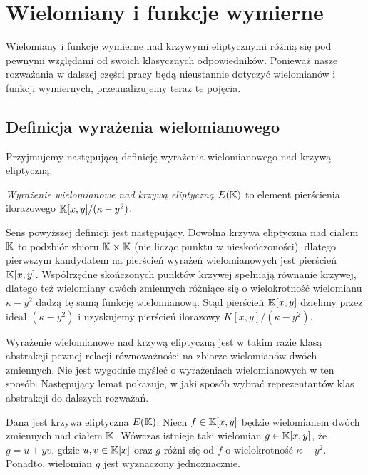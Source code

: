 \section{Wielomiany i funkcje wymierne}

Wielomiany i funkcje wymierne nad krzywymi eliptycznymi
różnią się pod pewnymi względami od swoich klasycznych odpowiedników.
Ponieważ nasze rozważania w dalszej części pracy
będą nieustannie dotyczyć wielomianów i funkcji wymiernych,
przeanalizujemy teraz te pojęcia.

\subsection*{Definicja wyrażenia wielomianowego}

Przyjmujemy następującą definicję
wyrażenia wielomianowego nad krzywą eliptyczną.

\begin{definition}
\emph{Wyrażenie wielomianowe nad krzywą eliptyczną $E(\mathbb{K})$}
to element pierścienia ilorazowego
$\mathbb{K}[x,y]/(\kappa - y^2)$.
\end{definition}

Sens powyższej definicji jest następujący.
Dowolna krzywa eliptyczna nad ciałem $\mathbb{K}$ to podzbiór zbioru $\mathbb{K} \times \mathbb{K}$
(nie licząc punktu w nieskończoności),
dlatego pierwszym kandydatem na pierścień wyrażeń wielomianowych
jest pierścień $\mathbb{K}[x,y]$.
Współrzędne skończonych punktów krzywej spełniają równanie krzywej,
dlatego też wielomiany dwóch zmiennych różniące się
o wielokrotność wielomianu $\kappa- y^2$
dadzą tę samą funkcję wielomianową.
Stąd pierścień $\mathbb{K}[x,y]$ dzielimy przez ideał $(\kappa- y^2)$
i uzyskujemy pierścień ilorazowy $K[x,y]/(\kappa - y^2)$.

Wyrażenie wielomianowe nad krzywą eliptyczną
jest w takim razie klasą abstrakcji
pewnej relacji równoważności na zbiorze wielomianów dwóch zmiennych.
Nie jest wygodnie myśleć o wyrażeniach wielomianowych w ten sposób.
Następujący lemat pokazuje,
w jaki sposób wybrać reprezentantów klas abstrakcji
do dalszych rozważań.

\begin{theorem}
Dana jest krzywa eliptyczna $E(\mathbb{K})$.
Niech $f \in \mathbb{K}[x,y]$
będzie wielomianem dwóch zmiennych nad ciałem $\mathbb{K}$.
Wówczas istnieje taki wielomian $g \in \mathbb{K}[x,y]$,
że $g = u + yv$, gdzie $u, v \in \mathbb{K}[x]$
oraz $g$ różni się od $f$ o wielokrotność $\kappa - y^2$.
Ponadto, wielomian $g$ jest wyznaczony jednoznacznie.
\end{theorem}

